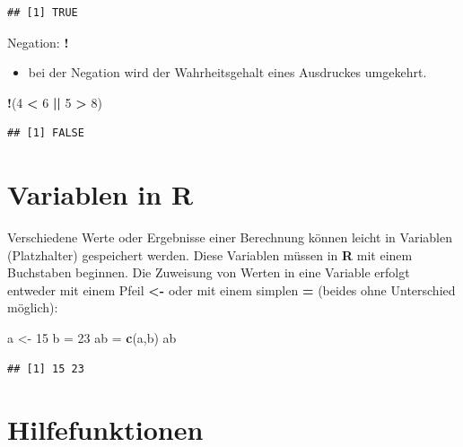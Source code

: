 \documentclass[]{book}
\newenvironment{Shaded}{\begin{snugshade}}{\end{snugshade}}
\newcommand{\KeywordTok}[1]{\textcolor[rgb]{0.13,0.29,0.53}{\textbf{#1}}}
\newcommand{\DecValTok}[1]{\textcolor[rgb]{0.00,0.00,0.81}{#1}}
\newcommand{\StringTok}[1]{\textcolor[rgb]{0.31,0.60,0.02}{#1}}
\newcommand{\OperatorTok}[1]{\textcolor[rgb]{0.81,0.36,0.00}{\textbf{#1}}}
\newcommand{\NormalTok}[1]{#1}
\providecommand{\tightlist}{%
  \setlength{\itemsep}{0pt}\setlength{\parskip}{0pt}}
\begin{document}
\begin{verbatim}
## [1] TRUE
\end{verbatim}

Negation: \textbf{!}

\begin{itemize}
\tightlist
\item
  bei der Negation wird der Wahrheitsgehalt eines Ausdruckes umgekehrt.
\end{itemize}

\begin{Shaded}
\begin{Highlighting}[]
\OperatorTok{!}\NormalTok{(}\DecValTok{4} \OperatorTok{<}\StringTok{ }\DecValTok{6} \OperatorTok{||}\StringTok{ }\DecValTok{5} \OperatorTok{>}\StringTok{ }\DecValTok{8}\NormalTok{)}
\end{Highlighting}
\end{Shaded}

\begin{verbatim}
## [1] FALSE
\end{verbatim}

\section{Variablen in R}\label{variablen-in-r}

Verschiedene Werte oder Ergebnisse einer Berechnung können leicht in
Variablen (Platzhalter) gespeichert werden. Diese Variablen müssen in
\textbf{R} mit einem Buchstaben beginnen. Die Zuweisung von Werten in
eine Variable erfolgt entweder mit einem Pfeil \textbf{\textless{}-}
oder mit einem simplen \textbf{=} (beides ohne Unterschied möglich):

\begin{Shaded}
\begin{Highlighting}[]
\NormalTok{a <-}\StringTok{ }\DecValTok{15}
\NormalTok{b =}\StringTok{ }\DecValTok{23}
\NormalTok{ab =}\StringTok{ }\KeywordTok{c}\NormalTok{(a,b)}
\NormalTok{ab}
\end{Highlighting}
\end{Shaded}

\begin{verbatim}
## [1] 15 23
\end{verbatim}

\section{Hilfefunktionen}\label{hilfefunktionen}
\end{document}
